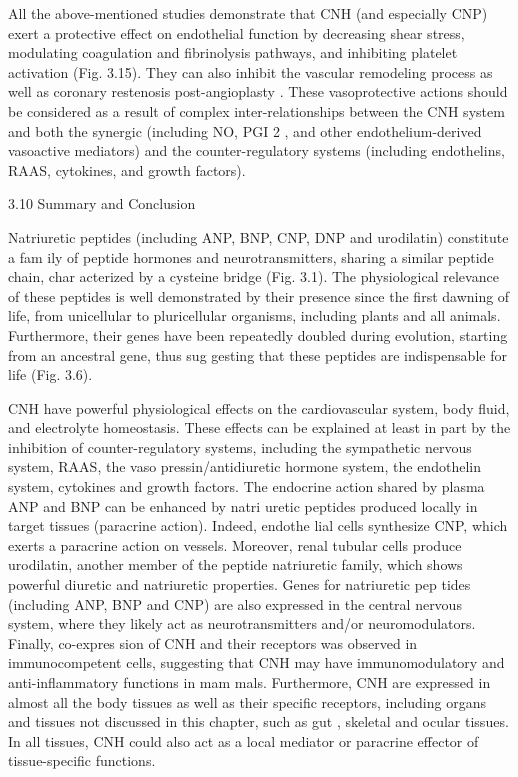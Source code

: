 \documentclass[14pt,a4paper,onecolumn]{extarticle}
\begin{document}
All the above-mentioned studies demonstrate that CNH (and especially CNP) exert a protective effect on endothelial function by decreasing shear stress, modulating coagulation and fibrinolysis pathways, and inhibiting platelet activation (Fig. 3.15). They can also inhibit the vascular remodeling process as well as coronary restenosis post-angioplasty \citep{56} \citep{84} \citep{85} \citep{86} \citep{87} \citep{88} \citep{89} \citep{267} \citep{281} \citep{283}. These vasoprotective actions should be considered as a result of complex inter-relationships between the CNH system and both the synergic (including NO, PGI 2 , and other endothelium-derived vasoactive mediators) and the counter-regulatory systems (including endothelins, RAAS, cytokines, and growth factors).

3.10 Summary and Conclusion

Natriuretic peptides (including ANP, BNP, CNP, DNP and urodilatin) constitute a fam ily of peptide hormones and neurotransmitters, sharing a similar peptide chain, char acterized by a cysteine bridge (Fig. 3.1). The physiological relevance of these peptides is well demonstrated by their presence since the first dawning of life, from unicellular to pluricellular organisms, including plants and all animals. Furthermore, their genes have been repeatedly doubled during evolution, starting from an ancestral gene, thus sug gesting that these peptides are indispensable for life (Fig. 3.6).

CNH have powerful physiological effects on the cardiovascular system, body fluid, and electrolyte homeostasis. These effects can be explained at least in part by the inhibition of counter-regulatory systems, including the sympathetic nervous system, RAAS, the vaso pressin/antidiuretic hormone system, the endothelin system, cytokines and growth factors.  The endocrine action shared by plasma ANP and BNP can be enhanced by natri uretic peptides produced locally in target tissues (paracrine action). Indeed, endothe lial cells synthesize CNP, which exerts a paracrine action on vessels. Moreover, renal tubular cells produce urodilatin, another member of the peptide natriuretic family, which shows powerful diuretic and natriuretic properties. Genes for natriuretic pep tides (including ANP, BNP and CNP) are also expressed in the central nervous system, where they likely act as neurotransmitters and/or neuromodulators. Finally, co-expres sion of CNH and their receptors was observed in immunocompetent cells, suggesting that CNH may have immunomodulatory and anti-inflammatory functions in mam mals. Furthermore, CNH are expressed in almost all the body tissues as well as their specific receptors, including organs and tissues not discussed in this chapter, such as gut \citep{285}, skeletal \citep{106} and ocular \citep{286} tissues. In all tissues, CNH could also act as a local mediator or paracrine effector of tissue-specific functions.
\end{document}
